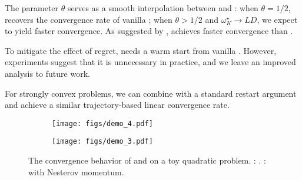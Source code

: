The parameter $\theta$ serves as a smooth interpolation between {\hdm} and {\hdmagd}: when $\theta = 1 / 2$,  recovers the convergence rate of
vanilla {\agd}; when $\theta > 1 / 2$ and $\omega_K^{\star}
\rightarrow L D$, we expect {\hdmagd} to yield faster convergence. As suggested by , {\hdmagd} achieves faster convergence than {\agd}.
\begin{rem}
To mitigate the effect of regret,  needs a warm start from vanilla {\agd}. However, experiments
  suggest that it is unnecessary in practice, and we leave an improved analysis to future work.
\end{rem}

\begin{rem}
For strongly convex problems, we can combine  with a
  standard restart argument \cite{d2021acceleration,roulet2017sharpness} and achieve a similar trajectory-based linear
  convergence rate.
\end{rem}

\begin{figure}
  \centering
  \begin{subfigure}{0.4\textwidth}
    \centering
\texttt{[image: figs/demo\_4.pdf]}
    \caption{\hdmhb}
    \label{fig:demo:c}
  \end{subfigure}
  \begin{subfigure}{0.4\textwidth}
    \centering
\texttt{[image: figs/demo\_3.pdf]}
    \caption{\hdmagd}
    \label{fig:demo:d}
  \end{subfigure}
\caption{The convergence behavior of {\hdmhb} and {\hdmagd} on a toy quadratic problem. : {\hdmhb}. \label{fig-demos}: {\hdm} with Nesterov momentum.} 
  \label{fig:demo:all}
\end{figure}